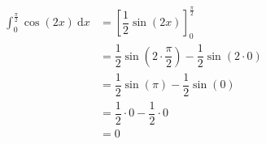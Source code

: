 \begin{align*}
\displaystyle\int_0^{\frac{\pi}{2}} \cos (2x) \:\text{d}x
&= \left[ \dfrac{1}{2} \sin(2x) \right]_{0}^{\frac{\pi}{2}} \\
&= \dfrac{1}{2} \sin\left(2 \cdot \dfrac{\pi}{2}\right) - \dfrac{1}{2} \sin(2 \cdot 0) \\
&= \dfrac{1}{2} \sin(\pi) - \dfrac{1}{2} \sin(0) \\
&= \dfrac{1}{2} \cdot 0 - \dfrac{1}{2} \cdot 0 \\
&= 0
\end{align*}

